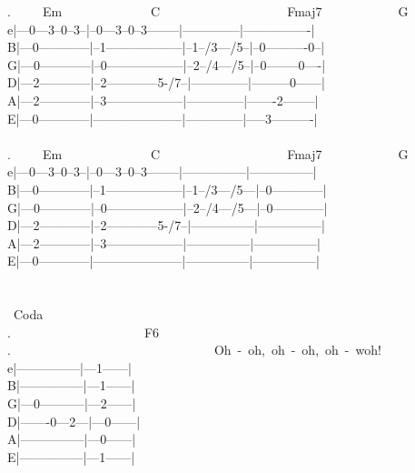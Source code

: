 {.\ \ \ \ \ Em\ \ \ \ \ \ \ \ \ \ \ \ \ \ C\ \ \ \ \ \ \ \ \ \ \ \ \ \ \ \ \ \ \ \ Fmaj7\ \ \ \ \ \ \ \ \ \ \ \ G\\
e|---0---3--0--3--|--0---3--0--3--------|--------------|----------------|\\
B|---0------------|--1------------------|--1--/3---/5--|--0----------0--|\\
G|---0------------|--0------------------|--2--/4---/5--|--0--------0----|\\
D|---2------------|--2------------5-/7--|--------------|---------0------|\\
A|---2------------|--3------------------|--------------|-------2--------|\\
E|---0------------|---------------------|--------------|-----3----------|\\
\\
.\ \ \ \ \ Em\ \ \ \ \ \ \ \ \ \ \ \ \ \ C\ \ \ \ \ \ \ \ \ \ \ \ \ \ \ \ \ \ \ \ Fmaj7\ \ \ \ \ \ \ \ \ \ \ \ G\\
e|---0---3--0--3--|--0---3--0--3--------|---------------|---------------|\\
B|---0------------|--1------------------|--1--/3---/5---|--0------------|\\
G|---0------------|--0------------------|--2--/4---/5---|--0------------|\\
D|---2------------|--2------------5-/7--|---------------|---------------|\\
A|---2------------|--3------------------|---------------|---------------|\\
E|---0------------|---------------------|---------------|---------------|\\
\\
\\
\lbrack\ Coda\rbrack\\
.\ \ \ \ \ \ \ \ \ \ \ \ \ \ \ \ \ \ \ \ \ F6\\
.\ \ \ \ \ \ \ \ \ \ \ \ \ \ \ \ \ \ \ \ \ \ \ \ \ \ \ \ \ \ \ \ Oh\ -\ oh,\ oh\ -\ oh,\ oh\ -\ woh!\\
e|---------------|---1------|\\
B|---------------|---1------|\\
G|---0-----------|---2------|\\
D|-------0---2---|---0------|\\
A|---------------|---0------|\\
E|---------------|---1------|\\
\\
}
